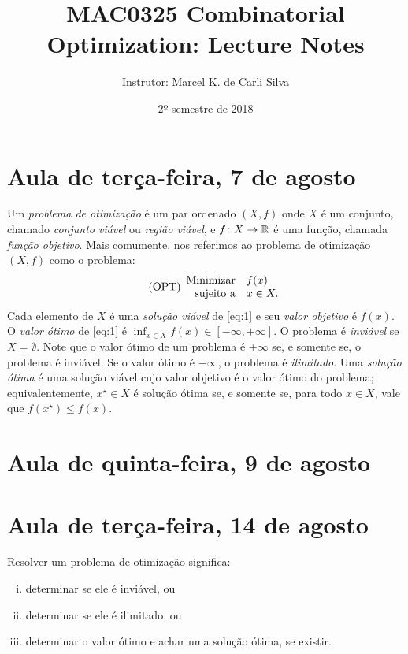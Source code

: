 \documentclass[10pt,reqno]{amsart}
\title{MAC0325 Combinatorial Optimization: Lecture Notes}
\author{Instrutor: Marcel {K.} de Carli Silva}
\date{2º semestre de 2018}
\begin{document}
\begin{abstract}

\end{abstract}

\maketitle

\tableofcontents

\section{Aula de terça-feira, 7 de agosto}

Um \emph{problema de otimização} é um par ordenado \((X,f)\) onde
\(X\) é um conjunto, chamado \emph{conjunto viável} ou \emph{região
  viável}, e \(f \colon X \to \mathbb{R}\) é uma função, chamada
\emph{função objetivo}.  Mais comumente, nos referimos ao problema de
otimização \((X,f)\) como o problema:
\begin{equation}
  \label{eq:1}
  \tag{OPT}
  \begin{array}{{rl}}
    \text{Minimizar} & f(x)     \\
    \text{sujeito a} & x \in X. \\
  \end{array}
\end{equation}
Cada elemento de \(X\) é uma \emph{solução viável} de \eqref{eq:1} e
seu \emph{valor objetivo} é \(f(x)\).  O \emph{valor ótimo}
de \eqref{eq:1} é \(\inf_{x \in X}f(x) \in [-\infty,+\infty]\).  O
problema é \emph{inviável} se \(X = \emptyset\).  Note que o valor
ótimo de um problema é \(+\infty\) se, e somente se, o problema é
inviável.  Se o valor ótimo é \(-\infty\), o problema é
\emph{ilimitado}.  Uma \emph{solução ótima} é uma solução viável cujo
valor objetivo é o valor ótimo do problema; equivalentemente,
\(x^{\star} \in X\) é solução ótima se, e somente se, para todo
\(x \in X\), vale que \(f(x^{\star}) \leq f(x)\).

\section{Aula de quinta-feira, 9 de agosto}

\section{Aula de terça-feira, 14 de agosto}

Resolver um problema de otimização significa:
\begin{enumerate}[(i)]
\item determinar se ele é inviável, ou
\item determinar se ele é ilimitado, ou
\item determinar o valor ótimo e achar uma solução ótima, se existir.
\end{enumerate}
\end{document}
